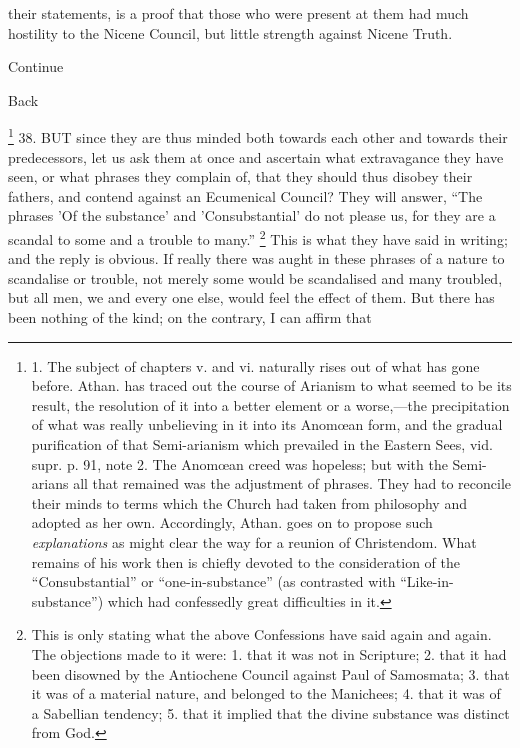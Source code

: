 their statements, is a proof that those who were present at them had
much hostility to the Nicene Council, but little strength against
Nicene Truth.

Continue



Back

\footnote{

1. The subject of chapters v.
and vi. naturally rises out of what has gone before. Athan. has traced
out the course of Arianism to what seemed to be its result, the
resolution of it into a better element or a worse,—the precipitation
of what was really unbelieving in it into its Anomœan form, and the
gradual purification of that Semi-arianism which prevailed in the
Eastern Sees, vid. supr. p. 91, note 2. The Anomœan creed was
hopeless; but with the Semi-arians all that remained was the
adjustment of phrases. They had to reconcile their minds to terms
which the Church had taken from philosophy and adopted as her own.
Accordingly, Athan. goes on to propose such \emph{explanations} as
might clear the way for a reunion of Christendom. What remains of his
work then is chiefly devoted to the consideration of the ``Consubstantial''
or ``one-in-substance'' (as contrasted with ``Like-in-substance'') which
had confessedly great difficulties in it.} 38. BUT
since they are thus minded both towards each other and towards
their predecessors, let us ask them at once and ascertain what
extravagance they have seen, or what phrases they complain of, that
they should thus disobey their fathers, and contend against an
Ecumenical Council? They will answer, ``The phrases 'Of the substance'
and 'Consubstantial' do not please us, for they are a scandal to some
and a trouble to many.'' \footnote{This is only stating what the above Confessions have said again and
again. The objections made to it were: 1. that it was not in
Scripture; 2. that it had been disowned by the Antiochene Council
against Paul of Samosmata; 3. that it was of a material nature, and
belonged to the Manichees; 4. that it was of a Sabellian tendency; 5.
that it implied that the divine substance was distinct from God.}
This is what they have said in writing; and the reply is obvious. If
really there was aught in these phrases of a nature to scandalise or
trouble, not merely some would be scandalised and many troubled, but
all men, we and every one else, would feel the effect of them. But
there has been nothing of the kind; on the contrary, I can affirm that

